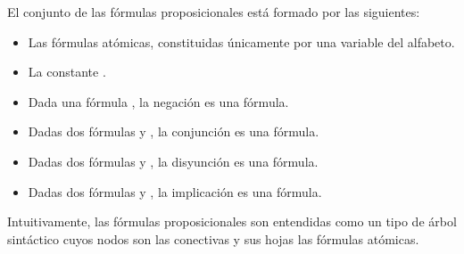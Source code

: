 \begin{isabellebody}
\begin{isamarkuptext}
  \begin{definicion}
    El conjunto de las fórmulas proposicionales está formado por las 
    siguientes:
    \begin{itemize}
      \item Las fórmulas atómicas, constituidas únicamente por una 
        variable del alfabeto. 
      \item La constante \isa{{\isasymbottom}}.
      \item Dada una fórmula , la negación  es una fórmula.
      \item Dadas dos fórmulas  y , la conjunción  es una
        fórmula.
      \item Dadas dos fórmulas  y , la disyunción  es una
        fórmula.
      \item Dadas dos fórmulas  y , la implicación  es 
        una fórmula.
    \end{itemize}
  \end{definicion}

  Intuitivamente, las fórmulas proposicionales son entendidas como un 
  tipo de árbol sintáctico cuyos nodos son las conectivas y sus hojas
  las fórmulas atómicas.



\end{isamarkuptext}
\end{isabellebody}
